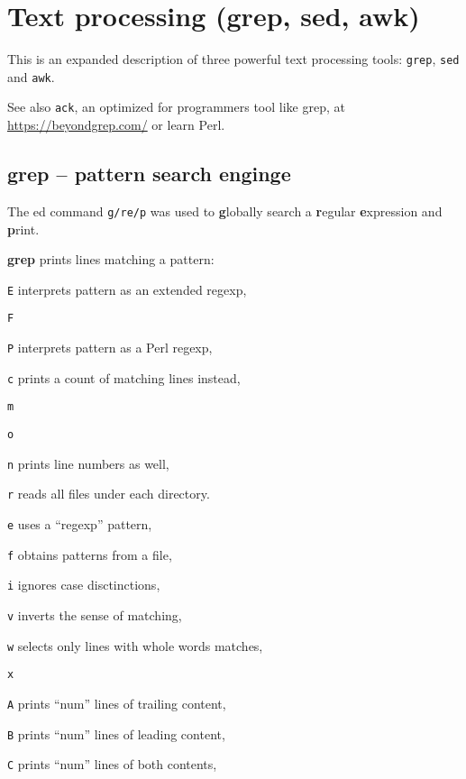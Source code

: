 \section{Text processing (grep, sed, awk)}
This is an expanded description of three powerful text processing tools:
\texttt{grep}, \texttt{sed} and \texttt{awk}.

See also \texttt{ack}, an optimized for programmers tool like grep, at \url{https://beyondgrep.com/} or learn Perl.

\subsection{grep -- pattern search enginge}
The ed command \texttt{g/re/p} was used to \textbf{g}lobally search a \textbf{r}egular \textbf{e}xpression and \textbf{p}rint.
\begin{compactenum}
\item [\cmdvar] \textbf{grep} prints lines matching a pattern:
\item [\texttt{E}] interprets pattern as an extended regexp,
\item [\texttt{F}] 
\item [\texttt{P}] interprets pattern as a Perl regexp,
\item []
\item [\texttt{c}] prints a count of matching lines instead,
\item [\texttt{m}] 
\item [\texttt{o}] 
\item [\texttt{n}] prints line numbers as well,
\item [\texttt{r}] reads all files under each directory.
\item []
\item [\texttt{e}] uses a ``regexp'' pattern,
\item [\texttt{f}] obtains patterns from a file,
\item [\texttt{i}] ignores case disctinctions,
\item [\texttt{v}] inverts the sense of matching,
\item [\texttt{w}] selects only lines with whole words matches,
\item [\texttt{x}] 
\item []
\item [\texttt{A}] prints ``num'' lines of trailing content,
\item [\texttt{B}] prints ``num'' lines of leading content,
\item [\texttt{C}] prints ``num'' lines of both contents,
\end{compactenum}

